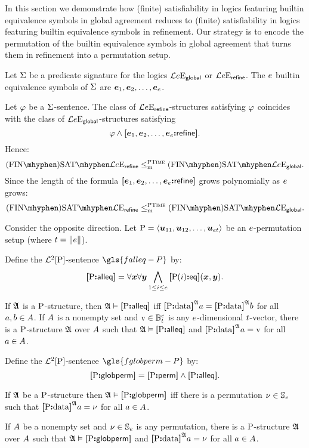 
In this section we demonstrate how (finite) satisfiability in logics featuring
builtin equivalence symbols in global agreement reduces to (finite)
satisfiability in logics featuring builtin equivalence symbols in refinement.
Our strategy is to encode the permutation of the builtin equivalence symbols in
global agreement that turns them in refinement into a permutation setup.

Let $\mathrm{\Sigma}$ be a predicate signature for the logics $\mathcal{L}{e}\mathrm{E}_{\mathsf{global}}$
or $\mathcal{L}{e}\mathrm{E}_{\mathsf{refine}}$.
The $e$ builtin equivalence symbols of $\mathrm{\Sigma}$ are $\bm{e}_{1}, \bm{e}_{2}, \dots,
\bm{e}_{e}$.

Let $\varphi$ be a $\mathrm{\Sigma}$-sentence.
The class of $\mathcal{L}{e}\mathrm{E}_{\mathsf{refine}}$-structures satisfying $\varphi$
coincides with the class of $\mathcal{L}{e}\mathrm{E}_{\mathsf{global}}$-structures satisfying
\[
  \varphi \land {\bm{[}\bm{e}_{1},\bm{e}_{2},\dots,\bm{e}_{e}\mathord{\bm{:}}\mathsf{refine}\bm{]}}.
\]
Hence:
\[
  \FinASat{\Fo\Eea\sze\agrefine} \red\cP
  \FinASat{\Fo\Eea\sze\agglobal}.
\]
Since the length of the formula ${\bm{[}\bm{e}_{1},\bm{e}_{2},\dots,\bm{e}_{e}\mathord{\bm{:}}\mathsf{refine}\bm{]}}$ grows
polynomially as $e$ grows:
\[
  \FinASat{\Fo\Eea\nosze\agrefine} \red\cP
  \FinASat{\Fo\Eea\nosze\agglobal}.
\]

Consider the opposite direction.
Let ${\mathrm{P}} = \left\langle \bm{u}_{11}, \bm{u}_{12}, \dots, \bm{u}_{et} \right\rangle$ be an
$e$-permutation setup (where $t = \|e\|$).
\begin{definition}
Define the $\mathcal{L}^{2}[{\mathrm{P}}]$-sentence $\gls{falleq-P}$ by:
\[
  {\bm{[}{\mathrm{P}}\mathord{\bm{:}}\mathsf{alleq}\bm{]}} = \forall\bm{x} \forall\bm{y} \bigwedge_{1 \leq i \leq e}
  {\bm{[}{\mathrm{P}}(i)\mathord{\bm{:}}\mathsf{eq}\bm{]}}(\bm{x},\bm{y}).
\]
\end{definition}
If $\mathfrak{A}$ is a ${\mathrm{P}}$-structure, then $\mathfrak{A} \vDash {\bm{[}{\mathrm{P}}\mathord{\bm{:}}\mathsf{alleq}\bm{]}}$ iff
${\bm{[}{\mathrm{P}}\mathord{\bm{:}}\mathrm{data}\bm{]}}^{\mathfrak{A}}a = {\bm{[}{\mathrm{P}}\mathord{\bm{:}}\mathrm{data}\bm{]}}^{\mathfrak{A}}b$ for all $a, b \in A$.
If $A$ is a nonempty set and $\mathrm{v} \in \mathbb{B}_{t}^{e}$ is any
$e$-dimensional $t$-vector, there is a ${\mathrm{P}}$-structure $\mathfrak{A}$ over
$A$ such that $\mathfrak{A} \vDash {\bm{[}{\mathrm{P}}\mathord{\bm{:}}\mathsf{alleq}\bm{]}}$ and
${\bm{[}{\mathrm{P}}\mathord{\bm{:}}\mathrm{data}\bm{]}}^{\mathfrak{A}}a = \mathrm{v}$ for all $a \in A$.

\begin{definition}
Define the $\mathcal{L}^{2}[{\mathrm{P}}]$-sentence $\gls{fglobperm-P}$ by:
\[
  {\bm{[}{\mathrm{P}}\mathord{\bm{:}}\mathsf{globperm}\bm{]}} = {\bm{[}{\mathrm{P}}\mathord{\bm{:}}\mathsf{perm}\bm{]}} \land {\bm{[}{\mathrm{P}}\mathord{\bm{:}}\mathsf{alleq}\bm{]}}.
\]
\end{definition}
If $\mathfrak{A}$ be a ${\mathrm{P}}$-structure then $\mathfrak{A} \vDash {\bm{[}{\mathrm{P}}\mathord{\bm{:}}\mathsf{globperm}\bm{]}}$ iff there
is a permutation $\nu \in \mathbb{S}_{e}$ such that
${\bm{[}{\mathrm{P}}\mathord{\bm{:}}\mathrm{data}\bm{]}}^{\mathfrak{A}}a = \nu$ for all $a \in A$.

If $A$ be a nonempty set and $\nu \in \mathbb{S}_{e}$ is any permutation,
there is a ${\mathrm{P}}$-structure $\mathfrak{A}$ over $A$ such that
$\mathfrak{A} \vDash {\bm{[}{\mathrm{P}}\mathord{\bm{:}}\mathsf{globperm}\bm{]}}$ and ${\bm{[}{\mathrm{P}}\mathord{\bm{:}}\mathrm{data}\bm{]}}^{\mathfrak{A}}a = \nu$ for all 
$a \in A$.

